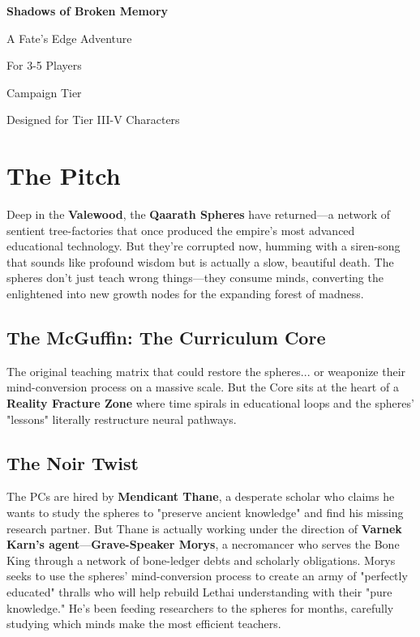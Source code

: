 \documentclass[11pt,twoside]{book}
\begin{document}
\frontmatter
\begin{titlepage}
\centering
\vspace*{2cm}
{\Huge\bfseries Shadows of Broken Memory\par}
\vspace{1cm}
{\Large A Fate's Edge Adventure\par}
\vspace{2cm}
{\Large For 3-5 Players\par}
\vspace{1cm}
{\large Campaign Tier\par}
\vfill
{\large Designed for Tier III-V Characters\par}
\end{titlepage}

\tableofcontents
\newpage

\mainmatter

\chapter{The Pitch}

Deep in the \textbf{Valewood}, the \textbf{Qaarath Spheres} have returned---a network of sentient tree-factories that once produced the empire's most advanced educational technology. But they're corrupted now, humming with a siren-song that sounds like profound wisdom but is actually a slow, beautiful death. The spheres don't just teach wrong things---they consume minds, converting the enlightened into new growth nodes for the expanding forest of madness.

\section*{The McGuffin: The Curriculum Core}

The original teaching matrix that could restore the spheres... or weaponize their mind-conversion process on a massive scale. But the Core sits at the heart of a \textbf{Reality Fracture Zone} where time spirals in educational loops and the spheres' "lessons" literally restructure neural pathways.

\section*{The Noir Twist}

The PCs are hired by \textbf{Mendicant Thane}, a desperate scholar who claims he wants to study the spheres to "preserve ancient knowledge" and find his missing research partner. But Thane is actually working under the direction of \textbf{Varnek Karn's agent}---\textbf{Grave-Speaker Morys}, a necromancer who serves the Bone King through a network of bone-ledger debts and scholarly obligations. Morys seeks to use the spheres' mind-conversion process to create an army of "perfectly educated" thralls who will help rebuild Lethai understanding with their "pure knowledge." He's been feeding researchers to the spheres for months, carefully studying which minds make the most efficient teachers.
\end{document}
